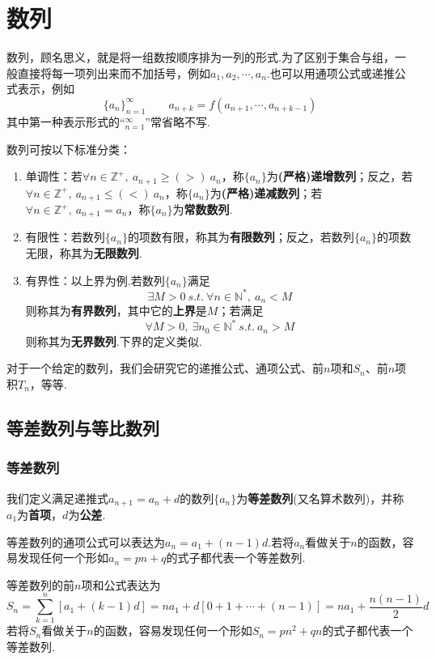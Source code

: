 \documentclass[lang=cn, zihao=4.5]{elegantbook}
\begin{document}
\chapter{数列}

数列，顾名思义，就是将一组数按顺序排为一列的形式.为了区别于集合与组，一般直接将每一项列出来而不加括号，例如$a_1,a_2, \cdots ,a_n$.也可以用通项公式或递推公式表示，例如
$$\{ a_n \}_{n=1}^{\infty} \qquad a_{n+k}=f(a_{n+1}, \cdots ,a_{n+k-1})$$
其中第一种表示形式的“$_{n=1}^{\infty}$”常省略不写.

数列可按以下标准分类：
\begin{enumerate}
	\item 单调性：若$\forall n \in \mathbb{Z}^+,~ a_{n+1} \geq (>)~ a_n$，称$\{ a_n \}$为\textbf{(严格)递增数列}；反之，若$\forall n \in \mathbb{Z}^+,~ a_{n+1} \leq (<)~ a_n$，称$\{ a_n \}$为\textbf{(严格)递减数列}；若$\forall n \in \mathbb{Z}^+,~ a_{n+1} = a_n$，称$\{ a_n \}$为\textbf{常数数列}.
	\item 有限性：若数列$\{ a_n \}$的项数有限，称其为\textbf{有限数列}；反之，若数列$\{ a_n \}$的项数无限，称其为\textbf{无限数列}.
	\item 有界性：以上界为例.若数列$\{ a_n \}$满足
	$$\exists M > 0 ~s.t.~ \forall n \in \mathbb{N}^{*},~ a_n<M$$
	则称其为\textbf{有界数列}，其中它的\textbf{上界}是$M$；若满足
	$$\forall M > 0 ,~ \exists n_0 \in \mathbb{N}^{*} ~s.t.~ a_n>M$$
	则称其为\textbf{无界数列}.下界的定义类似.
\end{enumerate}

对于一个给定的数列，我们会研究它的递推公式、通项公式、前$n$项和$S_n$、前$n$项积$T_n$，等等.

\section{等差数列与等比数列}

\subsection{等差数列}

我们定义满足递推式$a_{n+1}=a_n+d$的数列$\{ a_n \}$为\textbf{等差数列}(又名算术数列)，并称$a_1$为\textbf{首项}，$d$为\textbf{公差}.

等差数列的通项公式可以表达为$a_n=a_1+(n-1)d$.若将$a_n$看做关于$n$的函数，容易发现任何一个形如$a_n=pn+q$的式子都代表一个等差数列.

等差数列的前$n$项和公式表达为$$S_n = \sum _{k=1}^{n} [a_1+(k-1)d] = na_1 + d[0+ 1 + \cdots +(n-1)] = na_1 + \frac{n(n-1)}{2}d$$
若将$S_n$看做关于$n$的函数，容易发现任何一个形如$S_n=pn^2+qn$的式子都代表一个等差数列.
\end{document}
